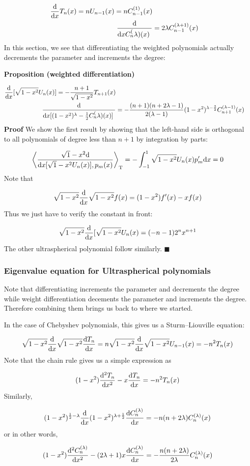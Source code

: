 \documentclass[12pt,a4paper]{article}
\def\half{ {1 \over 2} }
\def\D{ {\rm d} }
\def\addtab#1={#1\;&=}
\def\ccr{\\\addtab}
\def\ip<#1>{\left\langle{#1}\right\rangle}
\def\dx{\D x}
\def\endash{–}
\def\addtab#1={#1\;&=}
\def\ccr{\\\addtab}
\begin{document}
\begin{align*}
{\D \over \dx } T_n(x) = n U_{n-1}(x) = n C_{n-1}^{(1)}(x) \ccr
{\D \over \dx } C_n^{(\lambda)}(x) = 2 \lambda C_{n-1}^{(\lambda+1)}(x)
\end{align*}
In this section, we see that differentiating the weighted polynomials actually decrements the parameter and increments the degree:

\textbf{Proposition (weighted differentiation)}


\begin{align*}
{\D \over \dx }[\sqrt{1-x^2} U_n(x)] = - {n+1 \over \sqrt{1-x^2}} T_{n+1}(x) \ccr
{\D \over \dx }[(1-x^2)^{\lambda-\half} C_n^{(\lambda)}(x)] = -{(n+1) (n+2 \lambda-1) \over 2 (\lambda-1) }  (1-x^2)^{\lambda - {3 \over 2}} C_{n+1}^{(\lambda-1)}(x)
\end{align*}
\textbf{Proof} We show the first result by showing that the left-hand side is orthogonal to all  polynomials of degree less than $n+1$ by integration by parts:

\[
\ip< \sqrt{1-x^2} {\D \over \dx }[\sqrt{1-x^2} U_n(x)], p_m(x)>_{\rm T} = -\int_{-1}^1 \sqrt{1-x^2} U_n(x) p_m' \dx =0
\]
Note that

\[
\sqrt{1-x^2} {\D \over \dx } \sqrt{1-x^2} f(x) = (1-x^2) f'(x) - x f(x)
\]
Thus we just have to verify the constant in front:

\[
\sqrt{1-x^2} {\D \over \dx }[\sqrt{1-x^2} U_n(x) = (-n -1) 2^n x^{n+1}
\]
The other ultraspherical polynomial follow similarly. \ensuremath{\blacksquare}

\subsubsection{Eigenvalue equation for Ultraspherical polynomials}
Note that differentiating increments the parameter and decrements the degree while weight differentiation decements the parameter and increments the degree. Therefore combining them brings us back to where we started.

In the case of Chebyshev polynomials, this gives us a Sturm\ensuremath{\endash}Liouville equation:

\[
\sqrt{1-x^2} {\D \over \dx} \sqrt{1-x^2} {\D T_n \over \dx} = 
n \sqrt{1-x^2} {\D \over \dx} \sqrt{1-x^2} U_{n-1}(x) = -n^2 T_n(x)
\]
Note that the chain rule gives us a simple expression as

\[
(1-x^2) {\D^2 T_n \over \dx^2} -x {\D T_n \over \dx} = -n^2 T_n(x)
\]
Similarly,

\[
(1-x^2)^{\half - \lambda} {\D \over \dx}(1-x^2)^{\lambda + \half} {\D C_n^{(\lambda)} \over \dx} = -n (n+2 \lambda) C_n^{(\lambda)}(x)
\]
or in other words,

\[
(1-x^2) {\D^2 C_n^{(\lambda)} \over \dx^2} - (2\lambda+1) x {\D C_n^{(\lambda)} \over \dx}  = -{n (n+2 \lambda) \over 2\lambda}C_n^{(\lambda)}(x)
\]
\end{document}
